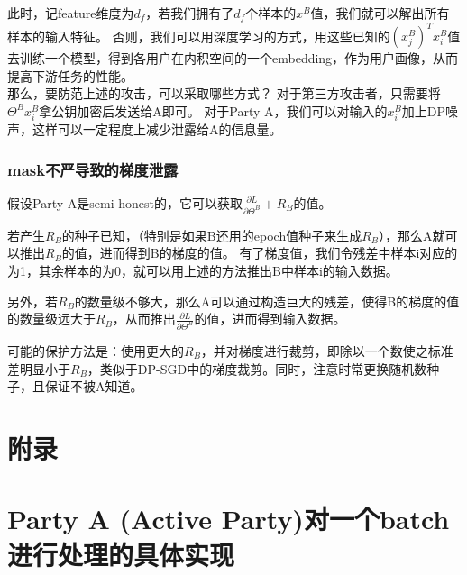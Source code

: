 \documentclass[twoside,11pt]{article}
\begin{document}
此时，记feature维度为$d_f$，若我们拥有了$d_f$个样本的$x^B$值，我们就可以解出所有样本的输入特征。
否则，我们可以用深度学习的方式，用这些已知的$(x_j^B)^T x_i^B$值去训练一个模型，得到各用户在内积空间的一个embedding，作为用户画像，从而提高下游任务的性能。
\\

那么，要防范上述的攻击，可以采取哪些方式？
对于第三方攻击者，只需要将$\Theta^B x_i^B$拿公钥加密后发送给A即可。
对于Party A，我们可以对输入的$x_i^B$加上DP噪声，这样可以一定程度上减少泄露给A的信息量。


\subsubsection{mask不严导致的梯度泄露}
假设Party A是semi-honest的，它可以获取$\frac{\partial L}{\partial \Theta^B}+R_B$的值。

若产生$R_B$的种子已知，（特别是如果B还用的epoch值种子来生成$R_B$），那么A就可以推出$R_B$的值，进而得到B的梯度的值。
有了梯度值，我们令残差中样本i对应的为1，其余样本的为0，就可以用上述的方法推出B中样本i的输入数据。

另外，若$R_B$的数量级不够大，那么A可以通过构造巨大的残差，使得B的梯度的值的数量级远大于$R_B$，从而推出$\frac{\partial L}{\partial \Theta^B}$的值，进而得到输入数据。

可能的保护方法是：使用更大的$R_B$，并对梯度进行裁剪，即除以一个数使之标准差明显小于$R_B$，类似于DP-SGD中的梯度裁剪。同时，注意时常更换随机数种子，且保证不被A知道。

\appendix
\section*{附录}

\section{Party A (Active Party)对一个batch进行处理的具体实现}
\end{document}
